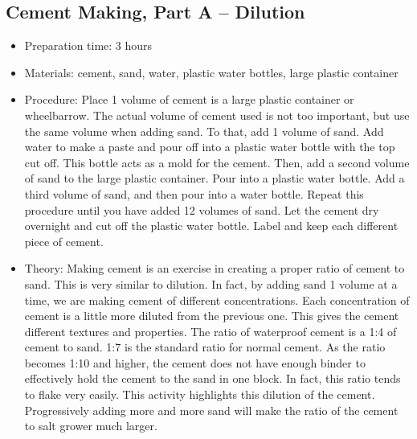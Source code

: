 \subsection{Cement Making, Part A -- Dilution}
\begin{itemize}
\item{Preparation time: 3 hours}
\item{Materials: cement, sand, water, plastic water bottles, large plastic container}
\item{Procedure: Place 1 volume of cement is a large plastic container or wheelbarrow. The actual volume of cement used is not too important, but use the same volume when adding sand. To that, add 1 volume of sand. Add water to make a paste and pour off into a plastic water bottle with the top cut off. This bottle acts as a mold for the cement. Then, add a second volume of sand to the large plastic container. Pour into a plastic water bottle. Add a third volume of sand, and then pour into a water bottle. Repeat this procedure until you have added 12 volumes of sand. Let the cement dry overnight and cut off the plastic water bottle. Label and keep each different piece of cement.}
\item{Theory: Making cement is an exercise in creating a proper ratio of cement to sand. This is very similar to dilution. In fact, by adding sand 1 volume at a time, we are making cement of different concentrations. Each concentration of cement is a little more diluted from the previous one. This gives the cement different textures and properties. The ratio of waterproof cement is a 1:4 of cement to sand. 1:7 is the standard ratio for normal cement. As the ratio becomes 1:10 and higher, the cement does not have enough binder to effectively hold the cement to the sand in one block. In fact, this ratio tends to flake very easily. This activity highlights this dilution of the cement. Progressively adding more and more sand will make the ratio of the cement to salt grower much larger.}
\end{itemize}

